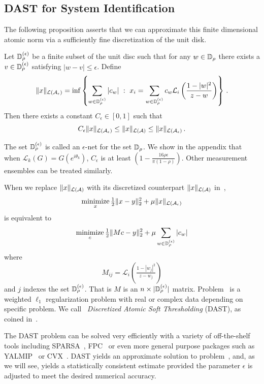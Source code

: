 \subsection{DAST for System Identification} %
\label{sec:dast_for_system_identification}
The following proposition asserts that we can approximate this finite dimensional atomic norm via a sufficiently fine discretization of the unit disk.

\begin{prop}\label{prop:algos:grid}
Let $\mathbb{D}_\rho^{(\epsilon)}$ be a finite subset of the unit disc such that for any $w \in \mathbb{D}_\rho$ there exists a $v \in \mathbb{D}_\rho^{(\epsilon)}$ satisfying $|w-v| \leq \epsilon$.  Define
\[
	\|x\|_{\mathcal{L}(\mathcal{A}_\epsilon)} = \inf\left\{ \sum_{w\in \mathbb{D}_{\rho}^{(\epsilon)}} |c_w| ~:~ x_i = \sum_{w\in\mathbb{D}_{\rho}^{(\epsilon)}} c_w\mathcal{L}_i\left(\frac{1-|w|^2}{z-w} \right)\right\}\,.
\]
Then there exists a constant $C_\epsilon \in [0,1]$ such that
\[
	C_\epsilon \|x\|_{\mathcal{L}(\mathcal{A}_{\epsilon})} \leq \|x\|_{\mathcal{L}(\mathcal{A})} \leq \|x\|_{\mathcal{L}(\mathcal{A}_{\epsilon})} \,.
\]
\end{prop}
\noindent The set $\mathbb{D}_\rho^{(\epsilon)}$ is called an $\epsilon$-net for the set $\mathbb{D}_\rho$.  We show in the appendix that when $\mathcal{L}_k(G) = G(e^{i\theta_k})$, $C_{\epsilon}$ is at least $(1-\tfrac{16 \rho \epsilon}{\pi(1-\rho)})$.  Other measurement ensembles can be treated similarly.

When we replace $\|x\|_{\mathcal{L}(\mathcal{A})}$ with its discretized counterpart $\|x\|_{\mathcal{L}(\mathcal{A})}$ in~, 
\[
	\mathop{\operatorname{minimize}}_{x} \tfrac{1}{2}\|x-y\|_2^2 + \mu \|x\|_{\mathcal{L}(\mathcal{A}_\epsilon)}
\]
is equivalent to
\begin{equation}\label{eq:algos:DAST}
	\mathop{\operatorname{minimize}}_{c}  \tfrac{1}{2}\|Mc-y\|_2^2 + \mu \sum_{w\in \mathbb{D}_\rho^{(\epsilon)}} |c_w|
\end{equation}
where
\[
	M_{ij} = \mathcal{L}_i \left(\tfrac{1-|w_j|^2}{z-w_j}\right)
\]
and $j$ indexes the set $\mathbb{D}_{\rho}^{(\epsilon)}$. That is $M$ is an $n \times
|\mathbb{D}_\rho^{(\epsilon)}|$ matrix. Problem~ is a weighted $\ell_1$
regularization problem with real or complex data depending on specific problem.
We call~ \emph{Discretized Atomic Soft Thresholding} (DAST), as coined in~\cite{btr12}.

The DAST problem can be solved very efficiently with a variety of off-the-shelf
tools including SPARSA~\cite{wright09}, FPC~\cite{Hale08} or even more general
purpose packages such as YALMIP~\cite{YALMIP} or CVX~\cite{cvx}. DAST yields an
approximate solution to problem~, and, as we will
see, yields a statistically consistent estimate provided the parameter
$\epsilon$ is adjusted to meet the desired numerical accuracy.

